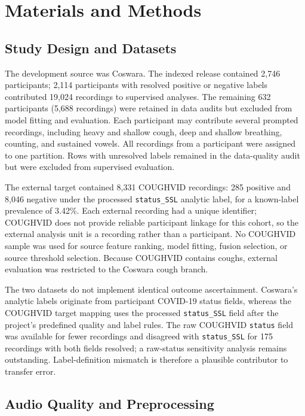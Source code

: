 \section{Materials and Methods}

\subsection{Study Design and Datasets}

The development source was Coswara. The indexed release contained 2,746
participants; 2,114 participants with resolved positive or negative labels
contributed 19,024 recordings to supervised analyses. The remaining 632
participants (5,688 recordings) were retained in data audits but excluded from
model fitting and evaluation. Each participant may contribute several
prompted recordings, including heavy and shallow cough, deep and shallow
breathing, counting, and sustained vowels. All recordings from a participant
were assigned to one partition. Rows with unresolved labels remained in the
data-quality audit but were excluded from supervised evaluation.

The external target contained 8,331 COUGHVID recordings: 285 positive and
8,046 negative under the processed \texttt{status\_SSL} analytic label, for a
known-label prevalence of 3.42\%. Each external recording had a unique
identifier; COUGHVID does not provide reliable participant linkage for this
cohort, so the external analysis unit is a recording rather than a participant.
No
COUGHVID sample was used for source feature ranking, model fitting, fusion
selection, or source threshold selection. Because COUGHVID contains coughs,
external evaluation was restricted to the Coswara cough branch.

The two datasets do not implement identical outcome ascertainment. Coswara's
analytic labels originate from participant COVID-19 status fields, whereas the
COUGHVID target mapping uses the processed \texttt{status\_SSL} field after the
project's predefined quality and label rules. The raw COUGHVID \texttt{status}
field was available for fewer recordings and disagreed with \texttt{status\_SSL}
for 175 recordings with both fields resolved; a raw-status sensitivity analysis
remains outstanding. Label-definition mismatch is therefore a plausible
contributor to transfer error.

\subsection{Audio Quality and Preprocessing}

